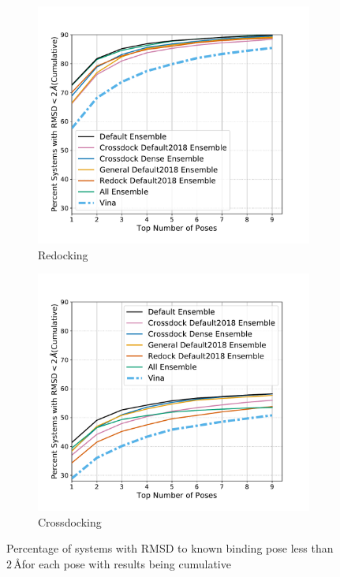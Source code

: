 \documentclass[journal=jcisd8,manuscript=article]{achemso}
\begin{document}
\begin{figure}
	\begin{subfigure}[b]{0.48\textwidth}
		\centering
		\includegraphics[width=\textwidth]{figures/redocking/rescore_ensembles_line.pdf}
		\caption{Redocking}
		\label{fig:RescoreEnsembleRedock}
        \end{subfigure}    
	\begin{subfigure}[b]{0.48\textwidth} 
		\centering
		\includegraphics[width=\textwidth]{figures/crossdocking/rescore_ensembles_line.pdf}
		\caption{Crossdocking}
		\label{fig:RescoreEnsembleCrossdock}
        \end{subfigure}    
	\caption{Percentage of systems with RMSD to known binding pose less than $2\,$\AA for each pose with results being cumulative}
	\label{fig:RescoreEnsemble}
\end{figure}    
\end{document}
